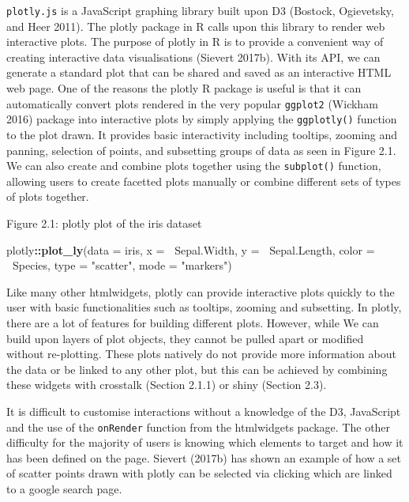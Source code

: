 \documentclass[11pt,]{report}
\newenvironment{Shaded}{\begin{snugshade}}{\end{snugshade}}
\newcommand{\KeywordTok}[1]{\textcolor[rgb]{0.13,0.29,0.53}{\textbf{#1}}}
\newcommand{\DataTypeTok}[1]{\textcolor[rgb]{0.13,0.29,0.53}{#1}}
\newcommand{\StringTok}[1]{\textcolor[rgb]{0.31,0.60,0.02}{#1}}
\newcommand{\OperatorTok}[1]{\textcolor[rgb]{0.81,0.36,0.00}{\textbf{#1}}}
\newcommand{\NormalTok}[1]{#1}
\begin{document}
\texttt{plotly.js} is a JavaScript graphing library built upon D3
(Bostock, Ogievetsky, and Heer 2011). The plotly package in R calls upon
this library to render web interactive plots. The purpose of plotly in R
is to provide a convenient way of creating interactive data
visualisations (Sievert 2017b). With its API, we can generate a standard
plot that can be shared and saved as an interactive HTML web page. One
of the reasons the \textsf{plotly} R package is useful is that it can
automatically convert plots rendered in the very popular
\texttt{ggplot2} (Wickham 2016) package into interactive plots by simply
applying the \texttt{ggplotly()} function to the plot drawn. It provides
basic interactivity including tooltips, zooming and panning, selection
of points, and subsetting groups of data as seen in Figure 2.1. We can
also create and combine plots together using the \texttt{subplot()}
function, allowing users to create facetted plots manually or combine
different sets of types of plots together.

Figure 2.1: plotly plot of the iris dataset

\begin{Shaded}
\begin{Highlighting}[]
\NormalTok{plotly}\OperatorTok{::}\KeywordTok{plot_ly}\NormalTok{(}\DataTypeTok{data =}\NormalTok{ iris, }\DataTypeTok{x =} \OperatorTok{~}\NormalTok{Sepal.Width,}
                \DataTypeTok{y =} \OperatorTok{~}\NormalTok{Sepal.Length, }\DataTypeTok{color =} \OperatorTok{~}\NormalTok{Species,}
                \DataTypeTok{type =} \StringTok{"scatter"}\NormalTok{, }\DataTypeTok{mode =} \StringTok{"markers"}\NormalTok{)}
\end{Highlighting}
\end{Shaded}

Like many other htmlwidgets, \textsf{plotly} can provide interactive
plots quickly to the user with basic functionalities such as tooltips,
zooming and subsetting. In \textsf{plotly}, there are a lot of features
for building different plots. However, while We can build upon layers of
plot objects, they cannot be pulled apart or modified without
re-plotting. These plots natively do not provide more information about
the data or be linked to any other plot, but this can be achieved by
combining these widgets with crosstalk (Section 2.1.1) or shiny (Section
2.3).

It is difficult to customise interactions without a knowledge of the D3,
JavaScript and the use of the \texttt{onRender} function from the
htmlwidgets package. The other difficulty for the majority of users is
knowing which elements to target and how it has been defined on the
page. Sievert (2017b) has shown an example of how a set of scatter
points drawn with \textsf{plotly} can be selected via clicking which are
linked to a google search page.
\end{document}
